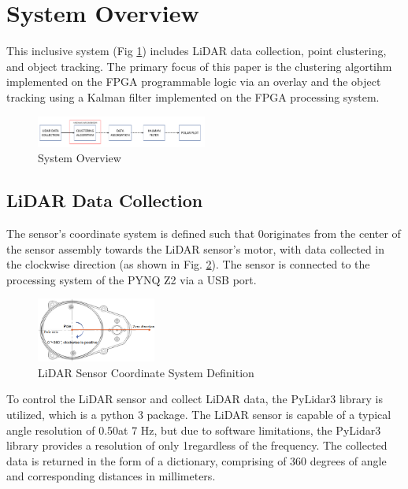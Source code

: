 \documentclass[journal]{IEEEtran} %
\begin{document}
\section{System Overview}
This inclusive system (Fig \ref{fig:sysOverview}) includes LiDAR data collection, point clustering, and object tracking. The primary focus of this paper is the clustering algortihm implemented on the FPGA programmable logic via an overlay and the object tracking using a Kalman filter implemented on the FPGA processing system. 

\begin{figure}[h]
  \centering
  \includegraphics[width=0.5\textwidth]{sysOverview}
  \caption{System Overview}
  \label{fig:sysOverview}
\end{figure}

\subsection{LiDAR Data Collection}

The sensor's coordinate system is defined such that 0\textdegree originates from the center of the sensor assembly towards the LiDAR sensor's motor, with data collected in the clockwise direction (as shown in Fig. \ref{fig:polarLiDAR}). The sensor is connected to the processing system of the PYNQ Z2 via a USB port.

\begin{figure}[h]
  \centering
  \includegraphics[width=0.35\textwidth]{polarLiDAR}
  \caption{LiDAR Sensor Coordinate System Definition}
  \label{fig:polarLiDAR}
\end{figure}

 To control the LiDAR sensor and collect LiDAR data, the PyLidar3 library is utilized, which is a python 3 package. The LiDAR sensor is capable of a typical angle resolution of 0.50\textdegree at 7 Hz, but due to software limitations, the PyLidar3 library provides a resolution of only 1\textdegree regardless of the frequency. The collected data is returned in the form of a dictionary, comprising of 360 degrees of angle and corresponding distances in millimeters.\\
\end{document}
